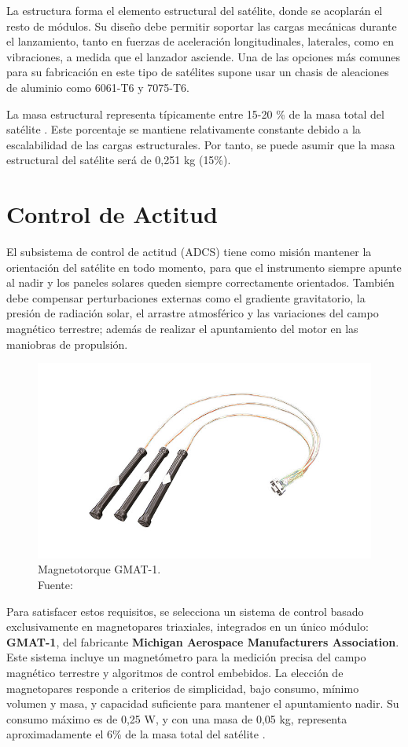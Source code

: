 La estructura forma el elemento estructural del satélite, donde se acoplarán el resto de módulos. Su diseño debe permitir soportar las cargas mecánicas durante el lanzamiento, tanto en fuerzas de aceleración longitudinales, laterales, como en vibraciones, a medida que el lanzador asciende. Una de las opciones más comunes para su fabricación en este tipo de satélites supone usar un chasis de aleaciones de aluminio como 6061-T6 y 7075-T6.

La masa estructural representa típicamente entre 15-20 \% de la masa total del satélite \cite{tsinas2001efficient}. Este porcentaje se mantiene relativamente constante debido a la escalabilidad de las cargas estructurales. Por tanto, se puede asumir que la masa estructural del satélite será de 0,251 kg (15\%).


\section{Control de Actitud}

El subsistema de control de actitud (ADCS) tiene como misión mantener la orientación del satélite en todo momento, para que el instrumento siempre apunte al nadir y los paneles solares queden siempre correctamente orientados. También debe compensar perturbaciones externas como el gradiente gravitatorio, la presión de radiación solar, el arrastre atmosférico y las variaciones del campo magnético terrestre; además de realizar el apuntamiento del motor en las maniobras de propulsión.

\begin{figure}[H]
    \centering
    \includegraphics[width=0.5\linewidth]{5.Mission/featured_image.jpg}
    \caption{Magnetotorque GMAT-1. \\Fuente: \cite{satcatalog:gmat1}}
\end{figure}

Para satisfacer estos requisitos, se selecciona un sistema de control basado exclusivamente en magnetopares triaxiales, integrados en un único módulo: \textbf{GMAT-1}, del fabricante\textbf{ Michigan Aerospace Manufacturers Association}. Este sistema incluye un magnetómetro para la medición precisa del campo magnético terrestre y algoritmos de control embebidos. La elección de magnetopares responde a criterios de simplicidad, bajo consumo, mínimo volumen y masa, y capacidad suficiente para mantener el apuntamiento nadir. Su consumo máximo es de 0,25 W, y con una masa de 0,05 kg, representa aproximadamente el 6\% de la masa total del satélite \cite{satcatalog:gmat1}.

